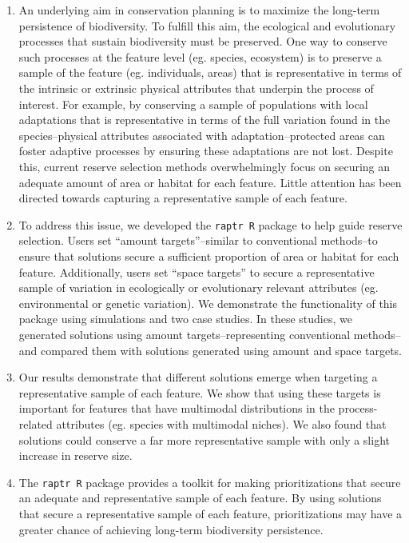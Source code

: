 \documentclass[11pt,]{article}
\begin{document}
\begin{enumerate}
\def\labelenumi{\arabic{enumi}.}
\item
  An underlying aim in conservation planning is to maximize the
  long-term persistence of biodiversity. To fulfill this aim, the
  ecological and evolutionary processes that sustain biodiversity must
  be preserved. One way to conserve such processes at the feature level
  (eg. species, ecosystem) is to preserve a sample of the feature (eg.
  individuals, areas) that is representative in terms of the intrinsic
  or extrinsic physical attributes that underpin the process of
  interest. For example, by conserving a sample of populations with
  local adaptations that is representative in terms of the full
  variation found in the species--physical attributes associated with
  adaptation--protected areas can foster adaptive processes by ensuring
  these adaptations are not lost. Despite this, current reserve
  selection methods overwhelmingly focus on securing an adequate amount
  of area or habitat for each feature. Little attention has been
  directed towards capturing a representative sample of each feature.
\item
  To address this issue, we developed the \texttt{raptr R} package to
  help guide reserve selection. Users set ``amount targets''--similar to
  conventional methods--to ensure that solutions secure a sufficient
  proportion of area or habitat for each feature. Additionally, users
  set ``space targets'' to secure a representative sample of variation
  in ecologically or evolutionary relevant attributes (eg. environmental
  or genetic variation). We demonstrate the functionality of this
  package using simulations and two case studies. In these studies, we
  generated solutions using amount targets--representing conventional
  methods--and compared them with solutions generated using amount and
  space targets.
\item
  Our results demonstrate that different solutions emerge when targeting
  a representative sample of each feature. We show that using these
  targets is important for features that have multimodal distributions
  in the process-related attributes (eg. species with multimodal
  niches). We also found that solutions could conserve a far more
  representative sample with only a slight increase in reserve size.
\item
  The \texttt{raptr R} package provides a toolkit for making
  prioritizations that secure an adequate and representative sample of
  each feature. By using solutions that secure a representative sample
  of each feature, prioritizations may have a greater chance of
  achieving long-term biodiversity persistence.
\end{enumerate}

\clearpage


\clearpage

\end{document}
